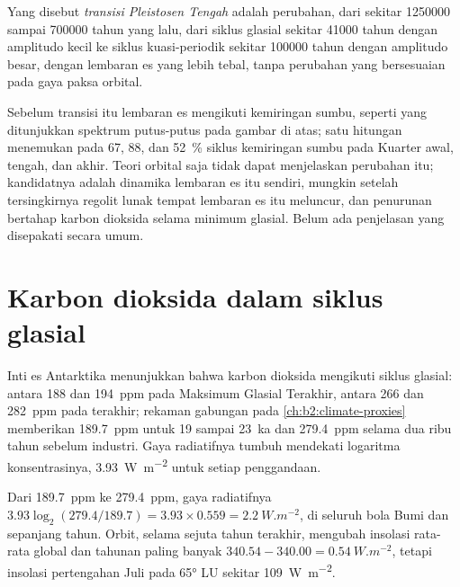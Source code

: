 \begin{definition}\label{def:b2:orbital-forcing:mpt}
Yang disebut \emph{transisi Pleistosen Tengah} adalah perubahan, dari sekitar
\num{1250000} sampai \num{700000} tahun yang lalu, dari siklus glasial sekitar \num{41000} tahun dengan
amplitudo kecil ke siklus kuasi-periodik sekitar \num{100000} tahun dengan amplitudo besar, dengan lembaran es
yang lebih tebal, tanpa perubahan yang bersesuaian pada gaya paksa orbital.
\end{definition}

Sebelum transisi itu lembaran es mengikuti kemiringan sumbu, seperti yang ditunjukkan spektrum putus-putus pada gambar
di atas; satu hitungan menemukan  pada 67, 88, dan \qty{52}{\percent} siklus
kemiringan sumbu pada Kuarter awal, tengah, dan akhir. Teori orbital saja tidak dapat menjelaskan perubahan itu; kandidatnya adalah dinamika
lembaran es itu sendiri, mungkin setelah tersingkirnya regolit lunak tempat lembaran es itu meluncur,
dan penurunan bertahap karbon dioksida selama minimum glasial. Belum ada penjelasan yang
disepakati secara umum.

\section{Karbon dioksida dalam siklus glasial}\label{sec:b2:orbital-forcing:co2}

Inti es Antarktika menunjukkan bahwa karbon dioksida mengikuti siklus glasial: antara 188 dan
\qty{194}{ppm} pada Maksimum Glasial Terakhir, antara 266 dan \qty{282}{ppm} pada  terakhir;
rekaman gabungan pada \cref{ch:b2:climate-proxies} memberikan \qty{189.7}{ppm} untuk 19 sampai
\qty{23}{ka} dan \qty{279.4}{ppm} selama dua ribu tahun sebelum industri. Gaya radiatifnya
tumbuh mendekati logaritma konsentrasinya, \qty{3.93}{W.m^{-2}} untuk setiap penggandaan.

\begin{example}\label{ex:b2:orbital-forcing:co2}
Dari \qty{189.7}{ppm} ke \qty{279.4}{ppm}, gaya radiatifnya $3.93\log_2(279.4/189.7) = 3.93 \times
0.559 = \qty{2.2}{W.m^{-2}}$, di seluruh bola Bumi dan sepanjang tahun. Orbit, selama sejuta
tahun terakhir, mengubah insolasi rata-rata global dan tahunan paling banyak $340.54 - 340.00 =
\qty{0.54}{W.m^{-2}}$, tetapi insolasi pertengahan Juli pada \ang{65} LU sekitar \qty{109}{W.m^{-2}}.
\end{example}

